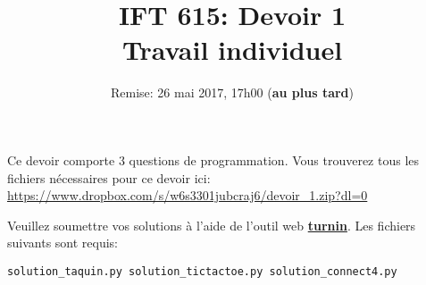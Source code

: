 \documentclass{article}
\begin{document}
\title{IFT 615: Devoir 1\\ Travail individuel}
\author{Remise: 26 mai 2017, 17h00 ({\bf au plus tard})}
\date{}
\maketitle

Ce devoir comporte 3 questions de programmation. Vous trouverez tous les fichiers
nécessaires pour ce devoir ici: \url{https://www.dropbox.com/s/w6s3301jubcraj6/devoir_1.zip?dl=0}

\vspace*{.3cm}
Veuillez soumettre vos solutions à l'aide de l'outil web {\bf \href{http://opus.dinf.usherbrooke.ca/turnin_off}{turnin}}. Les fichiers suivants sont requis:

\begin{verbatim}
solution_taquin.py solution_tictactoe.py solution_connect4.py
\end{verbatim}
\end{document}
